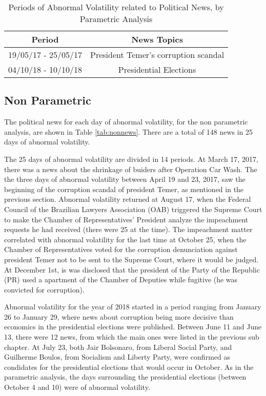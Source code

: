 \documentclass[a4paper]{article}
\begin{document}
\begin{table}[H]
\caption{Periods of Abnormal Volatility related to Political News, by Parametric Analysis}
\label{tab:respar}
\centering
\begin{tabular}{| c | c |}
\hline
Period & News Topics \\
\hline \hline
19/05/17 - 25/05/17 & President Temer's corruption scandal \\
\hline
04/10/18 - 10/10/18 & Presidential Elections \\
\hline
\end{tabular}
\end{table}


\subsection{Non Parametric}

The political news for each day of abnormal volatility, for the non parametric analysis, are shown in Table \ref{tab:nonnews}. There are a total of 148 news in 25 days of abnormal volatility.





The 25 days of abnormal volatility are divided in 14 periods. At March 17, 2017, there was a news about the shrinkage of buiders after Operation Car Wash. The the three days of abnormal volatility between April 19 and 23, 2017, saw the beginning of the corruption scandal of president Temer, as mentioned in the previous section. Abnormal volatility returned at August 17, when the Federal Council of the Brazilian Lawyers Association (OAB) triggered the Supreme Court to make the  Chamber of Representatives' President analyze the impeachment requests he had received (there were 25 at the time). The impeachment matter correlated with abnormal volatility for the last time at October 25, when the Chamber of Representatives voted for the corruption denunciation against president Temer not to be sent to the Supreme Court, where it would be judged. At December 1st, is was disclosed that the president of the Party of the Republic (PR) used a apartment of the Chamber of Deputies while fugitive (he was convicted for corruption).

Abnormal volatility for the year of 2018 started in a period ranging from January 26 to January 29, where news about corruption being more decisive than economics in the presidential elections were published. Between June 11 and June 13, there were 12 news, from which the main ones were listed in the previous sub chapter. At July 23, both Jair Bolsonaro, from Liberal Social Party, and Guilherme Boulos, from Socialism and Liberty Party, were confirmed as condidates for the presidential elections that would occur in October. As in the parametric analysis, the days surrounding the presidential elections (between October 4 and 10) were of abnormal volatility.
\end{document}
